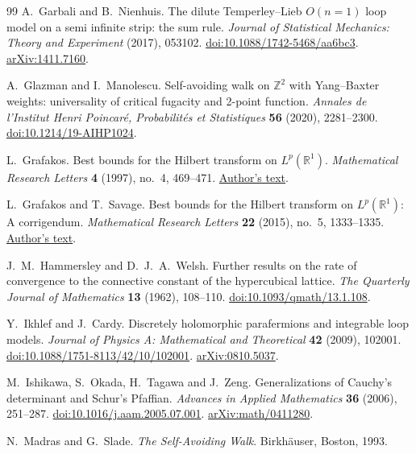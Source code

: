 \begin{thebibliography}{99}
A.~Garbali and B.~Nienhuis.
The dilute Temperley--Lieb $O(n=1)$ loop model on a semi infinite strip:
the sum rule.
\emph{Journal of Statistical Mechanics: Theory and Experiment} (2017), 053102.
\href{https://doi.org/10.1088/1742-5468/aa6bc3}{doi:10.1088/1742-5468/aa6bc3}.
\href{https://arxiv.org/abs/1411.7160}{arXiv:1411.7160}.

A.~Glazman and I.~Manolescu.
Self-avoiding walk on $\mathbb Z^2$ with Yang--Baxter weights: universality of critical fugacity and 2-point function.
\emph{Annales de l'Institut Henri Poincar\'e, Probabilit\'es et Statistiques}
\textbf{56} (2020), 2281--2300.
\href{https://doi.org/10.1214/19-AIHP1024}{doi:10.1214/19-AIHP1024}.

L.~Grafakos.
Best bounds for the Hilbert transform on $L^p(\mathbb R^1)$.
\emph{Mathematical Research Letters} \textbf{4} (1997), no.~4, 469--471.
\href{https://grafakos.missouri.edu/preprints/pichorides.pdf}{Author's text}.

L.~Grafakos and T.~Savage.
Best bounds for the Hilbert transform on $L^p(\mathbb R^1)$: A corrigendum.
\emph{Mathematical Research Letters} \textbf{22} (2015), no.~5, 1333--1335.
\href{https://grafakos.missouri.edu/preprints/grafakos-savage2.pdf}{Author's text}.

J.~M.~Hammersley and D.~J.~A.~Welsh.
Further results on the rate of convergence to the connective constant
of the hypercubical lattice.
\emph{The Quarterly Journal of Mathematics} \textbf{13} (1962), 108--110.
\href{https://doi.org/10.1093/qmath/13.1.108}{doi:10.1093/qmath/13.1.108}.

Y.~Ikhlef and J.~Cardy.
Discretely holomorphic parafermions and integrable loop models.
\emph{Journal of Physics A: Mathematical and Theoretical}
\textbf{42} (2009), 102001.
\href{https://doi.org/10.1088/1751-8113/42/10/102001}{doi:10.1088/1751-8113/42/10/102001}.
\href{https://arxiv.org/abs/0810.5037}{arXiv:0810.5037}.

M.~Ishikawa, S.~Okada, H.~Tagawa and J.~Zeng.
Generalizations of Cauchy's determinant and Schur's Pfaffian.
\emph{Advances in Applied Mathematics} \textbf{36} (2006), 251--287.
\href{https://doi.org/10.1016/j.aam.2005.07.001}{doi:10.1016/j.aam.2005.07.001}.
\href{https://arxiv.org/abs/math/0411280}{arXiv:math/0411280}.

N.~Madras and G.~Slade.
\emph{The Self-Avoiding Walk}.
Birkh\"auser, Boston, 1993.


\end{thebibliography}
